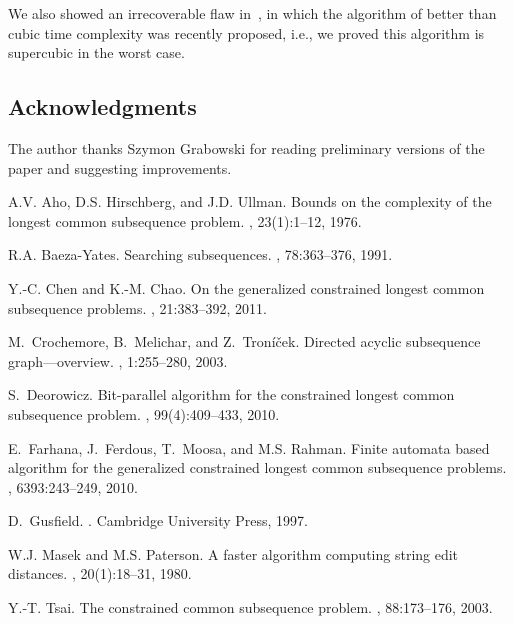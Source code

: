 \documentclass[12pt]{article}
\begin{document}
We also showed an irrecoverable flaw in~\cite{FFMR2010}, in which the algorithm of better than cubic time complexity was recently proposed, i.e., we proved this algorithm is supercubic in the worst case.

\subsection*{Acknowledgments}
The author thanks Szymon Grabowski for reading preliminary versions of the paper and suggesting improvements.

\begin{thebibliography}{1}

A.V. Aho, D.S. Hirschberg, and J.D. Ullman.
\newblock Bounds on the complexity of the longest common subsequence problem.
, 23(1):1--12, 1976.

R.A. Baeza-Yates.
\newblock Searching subsequences.
, 78:363--376, 1991.

Y.-C. Chen and K.-M. Chao.
\newblock On the generalized constrained longest common subsequence problems.
, 21:383--392, 2011.

M.~Crochemore, B.~Melichar, and Z.~Tron{\'i}{\v{c}}ek.
\newblock Directed acyclic subsequence graph---overview.
, 1:255--280, 2003.

S.~Deorowicz.
\newblock Bit-parallel algorithm for the constrained longest common subsequence
  problem.
, 99(4):409--433, 2010.

E.~Farhana, J.~Ferdous, T.~Moosa, and M.S. Rahman.
\newblock Finite automata based algorithm for the generalized constrained
  longest common subsequence problems.
, 6393:243--249, 2010.

D.~Gusfield.
.
\newblock Cambridge University Press, 1997.

W.J. Masek and M.S. Paterson.
\newblock A faster algorithm computing string edit distances.
, 20(1):18--31, 1980.

Y.-T. Tsai.
\newblock The constrained common subsequence problem.
, 88:173--176, 2003.

\end{thebibliography}
 
\end{document}
